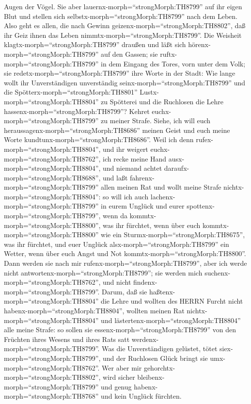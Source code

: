 Augen der Vögel.  Sie aber
lauernx-morph=``strongMorph:TH8799'' auf ihr eigen Blut und stellen sich
selbstx-morph=``strongMorph:TH8799'' nach dem Leben.  Also
geht es allen, die nach Gewinn geizenx-morph=``strongMorph:TH8802'', daß
ihr Geiz ihnen das Leben nimmtx-morph=``strongMorph:TH8799''.
 Die Weisheit klagtx-morph=``strongMorph:TH8799'' draußen
und läßt sich hörenx-morph=``strongMorph:TH8799'' auf den Gassen;
 sie ruftx-morph=``strongMorph:TH8799'' in dem Eingang des
Tores, vorn unter dem Volk; sie redetx-morph=``strongMorph:TH8799'' ihre
Worte in der Stadt:  Wie lange wollt ihr Unverständigen
unverständig seinx-morph=``strongMorph:TH8799'' und die
Spötterx-morph=``strongMorph:TH8801'' Lustx-morph=``strongMorph:TH8804''
zu Spötterei und die Ruchlosen die Lehre
hassenx-morph=``strongMorph:TH8799''?  Kehret
euchx-morph=``strongMorph:TH8799'' zu meiner Strafe. Siehe, ich will
euch heraussagenx-morph=``strongMorph:TH8686'' meinen Geist und euch
meine Worte kundtunx-morph=``strongMorph:TH8686''.  Weil
ich denn rufex-morph=``strongMorph:TH8804'', und ihr weigert
euchx-morph=``strongMorph:TH8762'', ich recke meine Hand
ausx-morph=``strongMorph:TH8804'', und niemand achtet
daraufx-morph=``strongMorph:TH8688'',  und laßt
fahrenx-morph=``strongMorph:TH8799'' allen meinen Rat und wollt meine
Strafe nichtx-morph=``strongMorph:TH8804'':  so will ich
auch lachenx-morph=``strongMorph:TH8799'' in eurem Unglück und eurer
spottenx-morph=``strongMorph:TH8799'', wenn da
kommtx-morph=``strongMorph:TH8800'', was ihr fürchtet, 
wenn über euch kommtx-morph=``strongMorph:TH8800'' wie ein
Sturmx-morph=``strongMorph:TH8675'', was ihr fürchtet, und euer Unglück
alsx-morph=``strongMorph:TH8799'' ein Wetter, wenn über euch Angst und
Not kommtx-morph=``strongMorph:TH8800''.  Dann werden sie
nach mir rufenx-morph=``strongMorph:TH8799'', aber ich werde nicht
antwortenx-morph=``strongMorph:TH8799''; sie werden mich
suchenx-morph=``strongMorph:TH8762'', und nicht
findenx-morph=``strongMorph:TH8799''.  Darum, daß sie
haßtenx-morph=``strongMorph:TH8804'' die Lehre und wollten des HERRN
Furcht nicht habenx-morph=``strongMorph:TH8804'',  wollten
meinen Rat nichtx-morph=``strongMorph:TH8804'' und
lästertenx-morph=``strongMorph:TH8804'' alle meine Strafe: 
so sollen sie essenx-morph=``strongMorph:TH8799'' von den Früchten ihres
Wesens und ihres Rats satt werdenx-morph=``strongMorph:TH8799''.
 Was die Unverständigen gelüstet, tötet
siex-morph=``strongMorph:TH8799'', und der Ruchlosen Glück bringt sie
umx-morph=``strongMorph:TH8762''.  Wer aber mir
gehorchtx-morph=``strongMorph:TH8802'', wird sicher
bleibenx-morph=``strongMorph:TH8799'' und genug
habenx-morph=``strongMorph:TH8768'' und kein Unglück fürchten.

